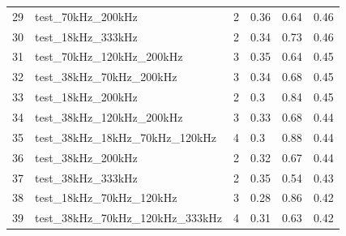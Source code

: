 \begin{longtable}{llllll}
29                     & test\_70kHz\_200kHz                               & 2                        & 0.36                           & 0.64                        & 0.46                           \\
30                     & test\_18kHz\_333kHz                               & 2                        & 0.34                           & 0.73                        & 0.46                           \\
31                     & test\_70kHz\_120kHz\_200kHz                       & 3                        & 0.35                           & 0.64                        & 0.45                           \\
32                     & test\_38kHz\_70kHz\_200kHz                        & 3                        & 0.34                           & 0.68                        & 0.45                           \\
33                     & test\_18kHz\_200kHz                               & 2                        & 0.3                            & 0.84                        & 0.45                           \\
34                     & test\_38kHz\_120kHz\_200kHz                       & 3                        & 0.33                           & 0.68                        & 0.44                           \\
35                     & test\_38kHz\_18kHz\_70kHz\_120kHz                 & 4                        & 0.3                            & 0.88                        & 0.44                           \\
36                     & test\_38kHz\_200kHz                               & 2                        & 0.32                           & 0.67                        & 0.44                           \\
37                     & test\_38kHz\_333kHz                               & 2                        & 0.35                           & 0.54                        & 0.43                           \\
38                     & test\_18kHz\_70kHz\_120kHz                        & 3                        & 0.28                           & 0.86                        & 0.42                           \\
39                     & test\_38kHz\_70kHz\_120kHz\_333kHz                & 4                        & 0.31                           & 0.63                        & 0.42                           \\

\end{longtable}
